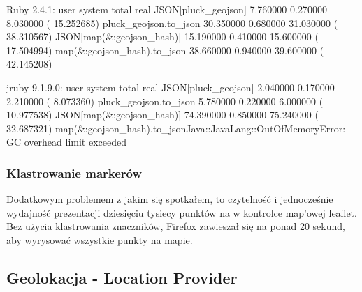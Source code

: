 Ruby 2.4.1:
       user     system      total        real
JSON[pluck_geojson]  7.760000   0.270000   8.030000 ( 15.252685)
pluck_geojson.to_json 30.350000   0.680000  31.030000 ( 38.310567)
JSON[map(&:geojson_hash)] 15.190000   0.410000  15.600000 ( 17.504994)
map(&:geojson_hash).to_json 38.660000   0.940000  39.600000 ( 42.145208)

jruby-9.1.9.0:
       user     system      total        real
JSON[pluck_geojson]  2.040000   0.170000   2.210000 (  8.073360)
pluck_geojson.to_json  5.780000   0.220000   6.000000 ( 10.977538)
JSON[map(&:geojson_hash)] 74.390000   0.850000  75.240000 ( 32.687321)
map(&:geojson_hash).to_jsonJava::JavaLang::OutOfMemoryError: GC overhead limit exceeded


\subsubsection{Klastrowanie markerów}

Dodatkowym problemem z jakim się spotkałem, to czytelność i jednocześnie wydajność prezentacji dziesięciu tysiecy punktów na w kontrolce map'owej leaflet. Bez użycia klastrowania znaczników, Firefox zawieszał się na ponad 20 sekund, aby wyrysować wszystkie punkty na mapie.










\subsection{Geolokacja - Location Provider}
